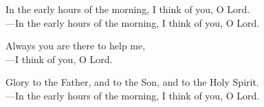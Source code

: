 \responsory

\noindent In the early hours of the morning, I think of you, O Lord.\\
{\color{red}---\thinspace}In the early hours of the morning, I think of you, O Lord.

\medskip\noindent Always you are there to help me,\\
{\color{red}---\thinspace}I think of you, O Lord.

\medskip\noindent Glory to the Father, and to the Son, and to the Holy Spirit.\\
{\color{red}---\thinspace}In the early hours of the morning, I think of you, O Lord.